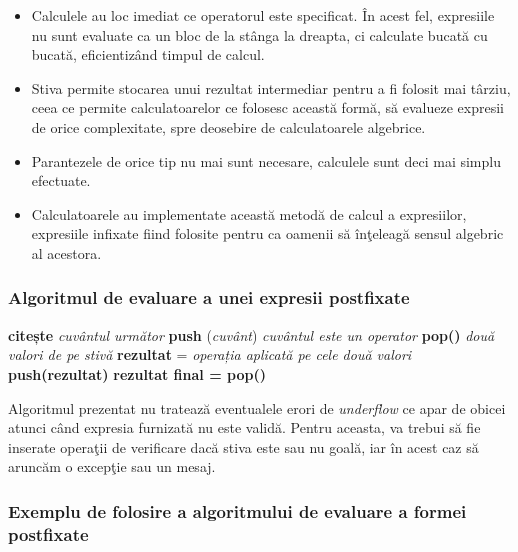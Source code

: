 \begin{itemize}
	\item Calculele au loc imediat ce operatorul este specificat. În acest fel, expresiile nu sunt evaluate ca un bloc de la stânga la dreapta, ci calculate bucată cu bucată, eficientizând timpul de
	calcul.
	\item Stiva permite stocarea unui rezultat intermediar pentru a fi folosit mai târziu, ceea ce permite calculatoarelor ce folosesc această formă, să evalueze expresii de orice complexitate, spre deosebire de calculatoarele algebrice.
	\item Parantezele de orice tip nu mai sunt necesare, calculele sunt deci mai simplu efectuate.
	\item Calculatoarele au implementate această metodă de calcul a expresiilor, expresiile infixate fiind folosite pentru ca oamenii să înţeleagă sensul algebric al acestora.
\end{itemize}

\subsubsection{Algoritmul de evaluare a unei expresii postfixate}

\begin{algorithm} [H]
	\caption{}\label{alg:expresii_postfixate}
	\begin{algorithmic}[1]
		\State \textbf{citește} \textit{cuvântul următor}	
		\State \textbf{push} (\textit{cuvânt})	
		\Else \textit{ cuvântul este un operator}
		\State \textbf{pop()} \textit{două valori de pe stivă}
		\State \textbf{rezultat} = \textit{operația aplicată pe cele două valori}
		\State \textbf{push(rezultat)}
		\EndIf		
		\EndWhile
		\State \textbf{rezultat final = pop()}			
	\end{algorithmic}
\end{algorithm}

Algoritmul prezentat nu tratează eventualele erori de \textit{underflow} ce apar de obicei atunci când expresia furnizată nu este validă.
Pentru aceasta, va trebui să fie inserate operaţii de verificare dacă stiva este sau nu goală, iar în acest caz să aruncăm o excepţie sau un mesaj.

\subsubsection{Exemplu de folosire a algoritmului de evaluare a formei postfixate}

